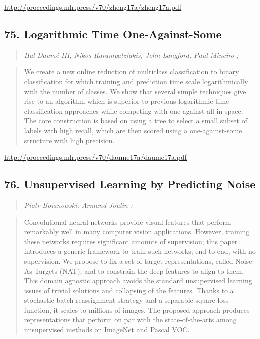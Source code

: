 \documentclass{article}
\begin{document}
\href{http://proceedings.mlr.press/v70/zheng17a/zheng17a.pdf}{http://proceedings.mlr.press/v70/zheng17a/zheng17a.pdf}

\subsection{75. Logarithmic Time One-Against-Some}

\begin{quote}
\footnotesize{\textit{Hal Daumé III, Nikos Karampatziakis, John Langford, Paul Mineiro ;}}

\end{quote}

\begin{quote}
    We create a new online reduction of multiclass classification to binary classification for which training and prediction time scale logarithmically with the number of classes. We show that several simple techniques give rise to an algorithm which is superior to previous logarithmic time classification approaches while competing with one-against-all in space. The core construction is based on using a tree to select a small subset of labels with high recall, which are then scored using a one-against-some structure with high precision.  
\end{quote}

\href{http://proceedings.mlr.press/v70/daume17a/daume17a.pdf}{http://proceedings.mlr.press/v70/daume17a/daume17a.pdf}

\subsection{76. Unsupervised Learning by Predicting Noise}

\begin{quote}
\footnotesize{\textit{Piotr Bojanowski, Armand Joulin ;}}

\end{quote}

\begin{quote}
    Convolutional neural networks provide visual features that perform remarkably well in many computer vision applications. However, training these networks requires significant amounts of supervision; this paper introduces a generic framework to train such networks, end-to-end, with no supervision. We propose to fix a set of target representations, called Noise As Targets (NAT), and to constrain the deep features to align to them. This domain agnostic approach avoids the standard unsupervised learning issues of trivial solutions and collapsing of the features. Thanks to a stochastic batch reassignment strategy and a separable square loss function, it scales to millions of images. The proposed approach produces representations that perform on par with the state-of-the-arts among unsupervised methods on ImageNet and Pascal VOC.  
\end{quote}
\end{document}
